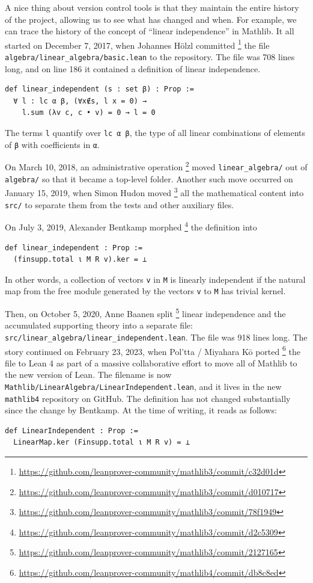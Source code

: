\documentclass[11pt]{article}
\def\lean{\lstinline[language=lean]}
\begin{document}
A nice thing about version control tools is that they maintain the entire history of the project, allowing us to see what has changed and when.
For example,
we can trace the history of the concept of ``linear independence'' in Mathlib.
It all started on December 7, 2017,
when Johannes H\"olzl committed%
\footnote{\url{https://github.com/leanprover-community/mathlib3/commit/c32d01d}}
the file \lean"algebra/linear_algebra/basic.lean"
to the repo\-si\-tory.
The file was 708 lines long, and on line 186 it contained a definition of linear independence.
\begin{lstlisting}
def linear_independent (s : set β) : Prop :=
  ∀ l : lc α β, (∀x∉s, l x = 0) →
    l.sum (λv c, c • v) = 0 → l = 0
\end{lstlisting}
The terms \lean"l" quantify over \lean"lc α β",
the type of all linear combinations of elements of \lean"β" with coefficients in \lean"α".

On March 10, 2018, an administrative operation%
\footnote{\url{https://github.com/leanprover-community/mathlib3/commit/d010717}}
moved \lean"linear_algebra/" out of \lean"algebra/" so that it became a top-level folder.
Another such move occurred on January 15, 2019,
when Simon Hudon moved%
\footnote{\url{https://github.com/leanprover-community/mathlib3/commit/78f1949}}
all the mathematical content into \lean"src/"
to separate them from the tests and other auxiliary files.

On July 3, 2019, Alexander Bentkamp morphed%
\footnote{\url{https://github.com/leanprover-community/mathlib3/commit/d2c5309}}
the definition into
\begin{lstlisting}
def linear_independent : Prop :=
  (finsupp.total ι M R v).ker = ⊥
\end{lstlisting}
In other words, a collection of vectors \lean"v" in \lean"M" is linearly independent
if the natural map from the free module generated by the vectors \lean"v" to \lean"M" has trivial kernel.

Then, on October 5, 2020,
Anne Baanen split%
\footnote{\url{https://github.com/leanprover-community/mathlib3/commit/2127165}}
linear independence and the accumulated supporting theory into a separate file:
\lean"src/linear_algebra/linear_independent.lean".
The file was 918 lines long.
The story continued on February 23, 2023,
when Pol'tta / Miyahara Kō ported%
\footnote{\url{https://github.com/leanprover-community/mathlib4/commit/db8c8ed}}
the file to Lean 4
as part of a massive collaborative effort to move all of Mathlib to the new version of Lean.
The filename is now \lean"Mathlib/LinearAlgebra/LinearIndependent.lean",
and it lives in the new \lean"mathlib4" repository on GitHub.
The definition has not changed substantially since the change by Bentkamp.
At the time of writing, it reads as follows:
\begin{lstlisting}
def LinearIndependent : Prop :=
  LinearMap.ker (Finsupp.total ι M R v) = ⊥
\end{lstlisting}
\end{document}
